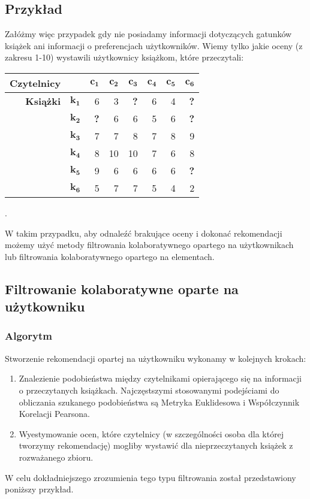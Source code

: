 \documentclass[12pt,a4paper]{report}
\begin{document}
\subsection{Przykład}
Załóżmy więc przypadek gdy nie posiadamy informacji dotyczących gatunków książek ani informacji o preferencjach użytkowników.
Wiemy tylko jakie oceny (z zakresu 1-10) wystawili użytkownicy książkom, które przeczytali:
\begin{center}
\begin{tabular}{|r|r|r|r|r|r|r|r|} \hline
\textbf{Czytelnicy} & & $\mathbf{c_1}$ & $\mathbf{c_2}$ & $\mathbf{c_3}$ & $\mathbf{c_4}$ & $\mathbf{c_5}$ & $\mathbf{c_6}$\\
\hline
\hline
\textbf{Książki} &$\mathbf{k_1}$ & 6 & 3 & \textbf{?} & 6 & 4 & \textbf{?} \\
\hline
&$\mathbf{k_2}$ & \textbf{?} & 6 & 6 & 5 & 6 & \textbf{?} \\
\hline
&$\mathbf{k_3}$ & 7 & 7 & 8 & 7 & 8 & 9 \\
\hline
&$\mathbf{k_4}$ & 8 & 10 & 10 & 7 & 6 & 8 \\
\hline
&$\mathbf{k_5}$ & 9 & 6 & 6 & 6 & 6 & \textbf{?} \\
\hline
&$\mathbf{k_6}$ & 5 & 7 & 7 & 5 & 4 & 2 \\
\hline
\end{tabular}.
\end{center}
W takim przypadku, aby odnaleźć brakujące oceny i dokonać rekomendacji możemy użyć metody filtrowania kolaboratywnego opartego na użytkownikach lub filtrowania kolaboratywnego opartego na elementach.

\subsection{Filtrowanie kolaboratywne oparte na użytkowniku}

\subsubsection{Algorytm}
Stworzenie rekomendacji opartej na użytkowniku wykonamy w kolejnych krokach:
\begin{enumerate}
\item Znalezienie podobieństwa między czytelnikami opierającego się na informacji o przeczytanych książkach. Najczęstszymi stosowanymi podejściami do obliczania szukanego podobieństwa są Metryka Euklidesowa i Współczynnik Korelacji Pearsona.
\item Wyestymowanie ocen, które czytelnicy (w szczególności osoba dla której tworzymy rekomendację) mogliby wystawić dla nieprzeczytanych książek z rozważanego zbioru.
\end{enumerate}
W celu dokładniejszego zrozumienia tego typu filtrowania został przedstawiony poniższy przykład.
\end{document}
